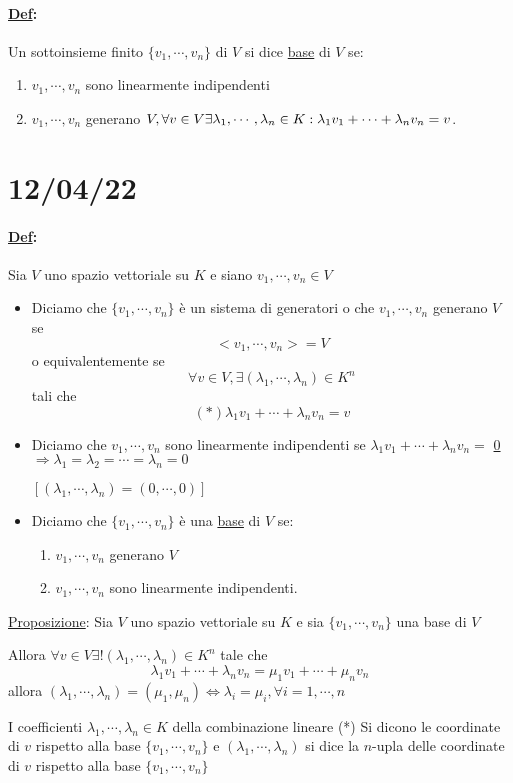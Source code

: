 \documentclass{article}
\newcommand{\ul}[1]{\underline{#1}}
\newcommand{\Def}[2]{\paragraph{\ul{Def}:}#1\\\hspace*{3em}\begin{minipage}{.8\textwidth}#2\end{minipage}}
\begin{document}
\Def{Un sottoinsieme finito $\{v_1,\cdots,v_n\}$ di $V$ si dice \ul{base} di $V$ se:}{
	\begin{enumerate}
		\item $v_1,\cdots,v_n$ sono linearmente indipendenti
		\item $v_1,\cdots,v_n$ generano $V,\forall v\in V\\\exists\lambda_1,\cdots,\lambda_n\in K:\lambda_1v_1+\cdots+\lambda_nv_n=v$.
	\end{enumerate}
}
\section{12/04/22}

\Def{Sia $V$ uno spazio vettoriale su $K$ e siano $v_1,\cdots,v_n\in V$}{
	\begin{itemize}
		\item Diciamo che $\{v_1,\cdots,v_n\}$ è un sistema di generatori o che $v_1,\cdots,v_n$ generano $V$ se
		      $$<v_1,\cdots,v_n>=V$$
		      o equivalentemente se
		      $$\forall v\in V,\exists(\lambda_1,\cdots,\lambda_n)\in K^n$$
		      tali che
		      $$(*)\lambda_1v_1+\cdots+\lambda_nv_n=v$$
		\item Diciamo che $v_1,\cdots,v_n$ sono linearmente indipendenti se $\lambda_1v_1+\cdots+\lambda_nv_n=$ \ul{0} $\Rightarrow\lambda_1=\lambda_2=\cdots=\lambda_n=0$

		      $[(\lambda_1,\cdots,\lambda_n)=(0,\cdots,0)]$

		\item Diciamo che $\{v_1,\cdots,v_n\}$ è una \ul{base} di $V$ se:
		      \begin{enumerate}
			      \item $v_1,\cdots,v_n$ generano $V$
			      \item $v_1,\cdots,v_n$ sono linearmente indipendenti.
		      \end{enumerate}
	\end{itemize}
}
\ul{Proposizione}: Sia $V$ uno spazio vettoriale su $K$ e sia $\{v_1,\cdots,v_n\}$ una base di $V$

Allora $\forall v\in V\exists!(\lambda_1,\cdots,\lambda_n)\in K^n$ tale che
$$\lambda_1v_1+\cdots+\lambda_nv_n=\mu_1v_1+\cdots+\mu_nv_n$$
allora $(\lambda_1,\cdots,\lambda_n)=(\mu_1,\mu_n)\Leftrightarrow\lambda_i=\mu_i,\forall i=1,\cdots,n$

I coefficienti $\lambda_1,\cdots,\lambda_n\in K$ della combinazione lineare (*) Si dicono le coordinate di $v$ rispetto alla base $\{v_1,\cdots,v_n\}$ e $(\lambda_1,\cdots,\lambda_n)$ si dice la $n$-upla delle coordinate di $v$ rispetto alla base $\{v_1,\cdots,v_n\}$
\end{document}
